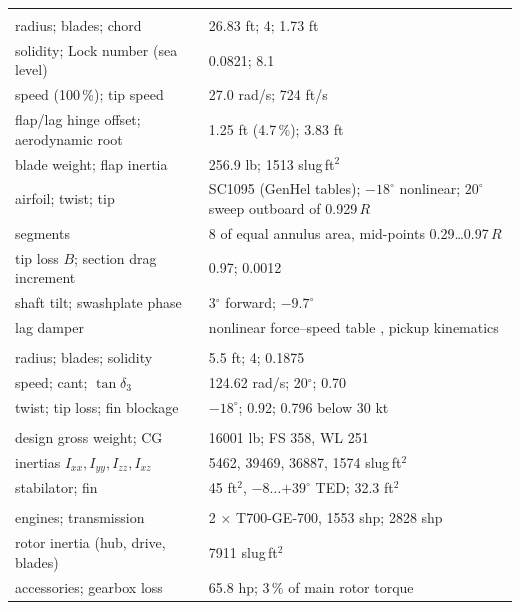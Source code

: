 \begin{tabularx}{\columnwidth}{@{}>{\raggedright\arraybackslash}p{3.0cm}X@{}}
\toprule
\multicolumn{2}{@{}l}{\emph{Main rotor} \cite{gh}} \\
radius; blades; chord & 26.83 ft; 4; 1.73 ft \\
solidity; Lock number (sea level) & 0.0821; 8.1 \\
speed (100\,\%); tip speed & 27.0 rad/s; 724 ft/s \\
flap/lag hinge offset; aerodynamic root & 1.25 ft (4.7\,\%); 3.83 ft \\
blade weight; flap inertia & 256.9 lb; 1513 slug\,ft$^2$ \\
airfoil; twist; tip & SC1095 (GenHel tables); $-18^\circ$ nonlinear; $20^\circ$ sweep outboard of 0.929\,$R$ \\
segments & 8 of equal annulus area, mid-points 0.29\ldots0.97\,$R$ \\
tip loss $B$; section drag increment & 0.97; 0.0012 \\
shaft tilt; swashplate phase & 3$^\circ$ forward; $-9.7^\circ$ \\
lag damper & nonlinear force--speed table \cite{gh}, pickup kinematics \\
\multicolumn{2}{@{}l}{\emph{Tail rotor} \cite{gh,hb}} \\
radius; blades; solidity & 5.5 ft; 4; 0.1875 \\
speed; cant; $\tan\delta_3$ & 124.62 rad/s; 20$^\circ$; 0.70 \\
twist; tip loss; fin blockage & $-18^\circ$; 0.92; 0.796 below 30 kt \\
\multicolumn{2}{@{}l}{\emph{Airframe} \cite{gh,bal}} \\
design gross weight; CG & 16001 lb; FS 358, WL 251 \\
inertias $I_{xx}, I_{yy}, I_{zz}, I_{xz}$ & 5462, 39469, 36887, 1574 slug\,ft$^2$ \\
stabilator; fin & 45 ft$^2$, $-8\ldots{+39}^\circ$ TED; 32.3 ft$^2$ \\
\multicolumn{2}{@{}l}{\emph{Drive} \cite{gh,perf}} \\
engines; transmission & 2 $\times$ T700-GE-700, 1553 shp; 2828 shp \\
rotor inertia (hub, drive, blades) & 7911 slug\,ft$^2$ \\
accessories; gearbox loss & 65.8 hp; 3\,\% of main rotor torque \\
\bottomrule
\end{tabularx}
